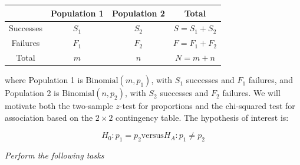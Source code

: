 \documentclass[letterpaper]{article}
\begin{document}
	\begin{center}
		\begin{tabular}{c|c|c|c}
			& Population 1 & Population 2 & Total \\
			\hline
			Successes & $S_1$ & $S_2$ & $S = S_1 + S_2$ \\
			Failures & $F_1$ & $F_2$ & $F = F_1 + F_2$ \\
			\hline
			Total & $m$ & $n$ & $N = m + n$
		\end{tabular}
	\end{center}
	
	where Population 1 is $\text{Binomial}(m,p_1)$, with $S_1$ successes and $F_1$ failures, and Population 2 is $\text{Binomial}(n,p_2)$, with $S_2$ successes and $F_2$ failures. 
	We will motivate both the two-sample $z$-test for proportions and the chi-squared test for association based on the $2\times2$ contingency table. 
	The hypothesis of interest is:
	
	\[
	H_0: p_1 = p_2
	\text{versus} 
	H_A: p_1 \neq p_2
	\]
	
	\emph{Perform the following tasks}
	
\end{document}
